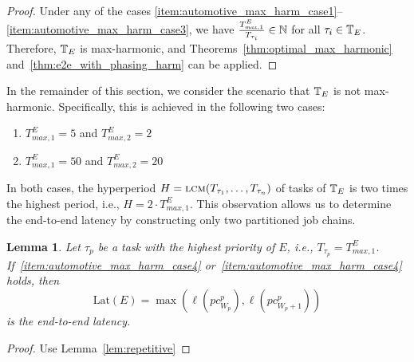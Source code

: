 \documentclass[10pt,conference]{resources/IEEEtran}
\newtheorem{lemma}[theorem]{Lemma}
\theoremstyle{definition}
\newcommand{\lat}{\mathrm{Lat}}
\newcommand{\pc}{{pc}}
\newcommand{\Tmaxone}{T^E_{\mathit{max},1}}
\newcommand{\Tmaxtwo}{T^E_{\mathit{max},2}}
\begin{document}
	\begin{proof}
		Under any of the cases \ref{item:automotive_max_harm_case1}--\ref{item:automotive_max_harm_case3}, we have
		$\frac{\Tmaxone}{T_{\tau_i}} \in \Nbb$ for all $\tau_i \in \mathbb{T}_E$.
		Therefore, $\mathbb{T}_E$ is max-harmonic, and Theorems~\ref{thm:optimal_max_harmonic} and~\ref{thm:e2e_with_phasing_harm} can be applied.
	\end{proof}

	In the remainder of this section, we consider the scenario that $\mathbb{T}_E$ is not max-harmonic. 
	Specifically, this is achieved in the following two cases:
	\begin{enumerate}[label=(\roman*),start=4]
		\item $\Tmaxone = 5$ and $\Tmaxtwo=2$ \label{item:automotive_max_harm_case4}
		\item $\Tmaxone = 50$ and $\Tmaxtwo=20$ \label{item:automotive_max_harm_case5}
	\end{enumerate}
	In both cases, the hyperperiod $H = \operatorname*{\textsc{lcm}}(T_{\tau_1}, \dots, T_{\tau_n})$ of tasks of $\mathbb{T}_E$ is two times the highest period, i.e., $H = 2\cdot \Tmaxone$.
	This observation allows us to determine the end-to-end latency by constructing only two partitioned job chains.

	\begin{lemma}
		Let $\tau_p$ be a task with the highest priority of $E$, i.e., $T_{\tau_p} = \Tmaxone$.
		If~\ref{item:automotive_max_harm_case4} or~\ref{item:automotive_max_harm_case4} holds, then 
		\begin{equation}
			\lat(E) = \max( \ell(\pc^p_{W_p}) , \ell(\pc^p_{W_p+1}) )
		\end{equation}
		is the end-to-end latency.
	\end{lemma}

	\begin{proof}
		Use Lemma~\ref{lem:repetitive}
	\end{proof}
\end{document}
